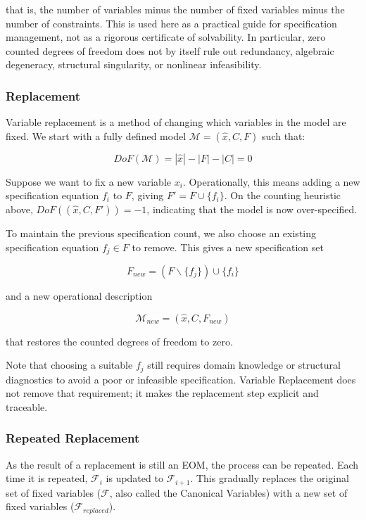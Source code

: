 that is, the number of variables minus the number of fixed variables
minus the number of constraints. This is used here as a practical guide
for specification management, not as a rigorous certificate of
solvability. In particular, zero counted degrees of freedom does not by
itself rule out redundancy, algebraic degeneracy, structural
singularity, or nonlinear infeasibility.

\hypertarget{replacement}{%
\subsubsection{Replacement}\label{replacement}}

Variable replacement is a method of changing which variables in the
model are fixed. We start with a fully defined model
\(\mathcal{M} = (\hat{x}, C, F)\) such that:

\[
DoF(\mathcal{M}) = |\hat{x}| - |F| - |C|  = 0
\]

Suppose we want to fix a new variable \(x_i\). Operationally, this means
adding a new specification equation \(f_i\) to \(F\), giving
\(F' = F \cup \{f_i\}\). On the counting heuristic above,
\(DoF((\hat{x},C,F')) = -1\), indicating that the model is now
over-specified.

To maintain the previous specification count, we also choose an
existing specification equation \(f_j \in F\) to remove. This gives a
new specification set

\[
F_{new} = (F \backslash \{f_j\}) \cup \{f_i\}
\]

and a new operational description

\[
\mathcal{M}_{new} = (\hat{x},C,F_{new})
\]

that restores the counted degrees of freedom to zero.

Note that choosing a suitable \(f_j\) still requires domain knowledge
or structural diagnostics to avoid a poor or infeasible specification.
Variable Replacement does not remove that requirement; it makes the
replacement step explicit and traceable.

\hypertarget{repeated-replacement}{%
\subsubsection{Repeated Replacement}\label{repeated-replacement}}

As the result of a replacement is still an EOM, the process can be
repeated. Each time it is repeated, \(\mathcal{F}_{i}\) is updated to
\(\mathcal{F}_{i+1}\). This gradually replaces the original set of
fixed variables (\(\mathcal{F}\), also called the Canonical Variables)
with a new set of fixed variables (\(\mathcal{F}_{replaced}\)).

